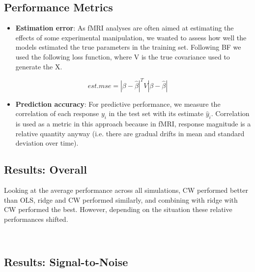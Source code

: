 \documentclass{article}
\begin{document}
\subsection{Performance Metrics}\label{performance-metrics}

\begin{itemize}
\itemsep1pt\parskip0pt
\item
  \textbf{Estimation error}: As fMRI analyses are often aimed at
  estimating the effects of some experimental manipulation, we wanted to
  assess how well the models estimated the true parameters in the
  training set. Following BF we used the following loss function, where
  V is the true covariance used to generate the X.
\end{itemize}

\[ est.mse = |\beta-\hat \beta|^T V |\beta - \hat \beta| \]

\begin{itemize}
\itemsep1pt\parskip0pt
\item
  \textbf{Prediction accuracy}: For predictive performance, we measure
  the correlation of each response $ y_i$ in the test set with its
  estimate \(\hat y_i\). Correlation is used as a metric in this approach because in fMRI, response magnitude is a relative quantity anyway (i.e. there are gradual drifts in mean and standard deviation over time).
  
\end{itemize}

    \subsection{Results: Overall}\label{results-overall}

Looking at the average performance across all simulations, CW performed
better than OLS, ridge and CW performed similarly, and combining with
ridge with CW performed the best. However, depending on the situation
these relative performances shifted.



    \begin{center}
    \end{center}
    { \hspace*{\fill} \\}
    
    \subsection{Results: Signal-to-Noise}\label{results-signal-to-noise}
\end{document}
